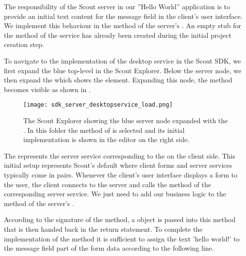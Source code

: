 %


The responsibility of the Scout server in our ''Hello World'' application is to provide an initial text content for the message field in the client's user interface.
We implement this behaviour in the  method of the server's .
An empty stub for the  method of the  service has already been created during the initial project creation step. 

To navigate to the implementation of the desktop service in the Scout SDK, we first expand the blue top-level  in the Scout Explorer.
Below the server node, we then expand the  which shows the  element.
Expanding this  node, the  method becomes visible as shown in .

\begin{figure}
\texttt{[image: sdk\_server\_desktopservice\_load.png]}
\caption{The Scout Explorer showing the blue server node expanded with the .
In this folder the  method of  is selected and its initial implementation is shown in the editor on the right side.}
\end{figure}

The  represents the server service corresponding to the  on the client side.
This initial setup represents Scout's default where client forms and server services typically come in pairs.
Whenever the client's user interface displays a form to the user, the client connects to the server and calls the  method of the corresponding server service.
We just need to add our business logic to the  method of the server's .

According to the signature of the  method, a  object is passed into this method that is then handed back in the return statement.
To complete the implementation of the  method it is sufficient to assign the text 'hello world!' to the message field part of the form data according to the following line.

